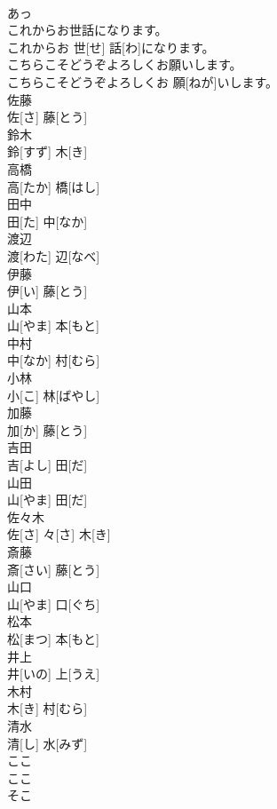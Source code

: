 \documentclass[8pt]{extreport}
\begin{document}
\begin{CJK}{UTF8}{min}
\\	あっ		
\\	これからお世話になります。	
\\	これからお 世[せ] 話[わ]になります。		
\\	こちらこそどうぞよろしくお願いします。	
\\	こちらこそどうぞよろしくお 願[ねが]いします。		
\\	佐藤	
\\	佐[さ] 藤[とう]		
\\	鈴木	
\\	鈴[すず] 木[き]		
\\	高橋	
\\	高[たか] 橋[はし]		
\\	田中	
\\	田[た] 中[なか]		
\\	渡辺	
\\	渡[わた] 辺[なべ]		
\\	伊藤	
\\	伊[い] 藤[とう]		
\\	山本	
\\	山[やま] 本[もと]		
\\	中村	
\\	中[なか] 村[むら]		
\\	小林	
\\	小[こ] 林[ばやし]		
\\	加藤	
\\	加[か] 藤[とう]		
\\	吉田	
\\	吉[よし] 田[だ]		
\\	山田	
\\	山[やま] 田[だ]		
\\	佐々木	
\\	佐[さ] 々[さ] 木[き]		
\\	斎藤	
\\	斎[さい] 藤[とう]		
\\	山口	
\\	山[やま] 口[ぐち]		
\\	松本	
\\	松[まつ] 本[もと]		
\\	井上	
\\	井[いの] 上[うえ]		
\\	木村	
\\	木[き] 村[むら]		
\\	清水	
\\	清[し] 水[みず]		
\\	ここ	
\\	ここ		
\\	そこ	

\end{CJK}
\end{document}
